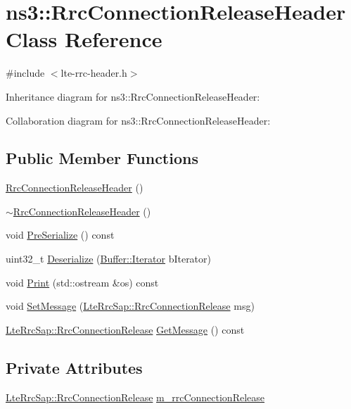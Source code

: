 \hypertarget{classns3_1_1RrcConnectionReleaseHeader}{}\section{ns3\+:\+:Rrc\+Connection\+Release\+Header Class Reference}
\label{classns3_1_1RrcConnectionReleaseHeader}


{\ttfamily \#include $<$lte-\/rrc-\/header.\+h$>$}



Inheritance diagram for ns3\+:\+:Rrc\+Connection\+Release\+Header\+:


Collaboration diagram for ns3\+:\+:Rrc\+Connection\+Release\+Header\+:
\subsection*{Public Member Functions}
\begin{DoxyCompactItemize}
\item 
\hyperlink{classns3_1_1RrcConnectionReleaseHeader_a98ec5d3983b630b9068efb63271c5474}{Rrc\+Connection\+Release\+Header} ()
\item 
\hyperlink{classns3_1_1RrcConnectionReleaseHeader_a9b264b4c8d6b6f7c850f5a220c9454b1}{$\sim$\+Rrc\+Connection\+Release\+Header} ()
\item 
void \hyperlink{classns3_1_1RrcConnectionReleaseHeader_adab7a1b137ad9205d8388de3569edfe8}{Pre\+Serialize} () const 
\item 
uint32\+\_\+t \hyperlink{classns3_1_1RrcConnectionReleaseHeader_ae3b88034e9a622c2c5b4104d9382325b}{Deserialize} (\hyperlink{classns3_1_1Buffer_1_1Iterator}{Buffer\+::\+Iterator} b\+Iterator)
\item 
void \hyperlink{classns3_1_1RrcConnectionReleaseHeader_acfec03f010e50247267a4051807d70ce}{Print} (std\+::ostream \&os) const 
\item 
void \hyperlink{classns3_1_1RrcConnectionReleaseHeader_a34423fc2a0a71984ec5f2afa3582f4e1}{Set\+Message} (\hyperlink{structns3_1_1LteRrcSap_1_1RrcConnectionRelease}{Lte\+Rrc\+Sap\+::\+Rrc\+Connection\+Release} msg)
\item 
\hyperlink{structns3_1_1LteRrcSap_1_1RrcConnectionRelease}{Lte\+Rrc\+Sap\+::\+Rrc\+Connection\+Release} \hyperlink{classns3_1_1RrcConnectionReleaseHeader_a0846afa48259099a6cad3e6e7312d877}{Get\+Message} () const 
\end{DoxyCompactItemize}
\subsection*{Private Attributes}
\begin{DoxyCompactItemize}
\item 
\hyperlink{structns3_1_1LteRrcSap_1_1RrcConnectionRelease}{Lte\+Rrc\+Sap\+::\+Rrc\+Connection\+Release} \hyperlink{classns3_1_1RrcConnectionReleaseHeader_af5b75bfe8c9734280de8393550954dad}{m\+\_\+rrc\+Connection\+Release}
\end{DoxyCompactItemize}
